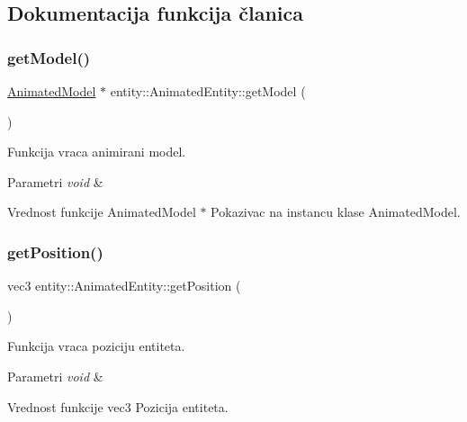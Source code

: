 \subsection{Dokumentacija funkcija članica}
\mbox{\label{classentity_1_1AnimatedEntity_ace7e7879a67cd75dac8cd867e79dd744}} 
\subsubsection{\texorpdfstring{get\+Model()}{getModel()}}
{\footnotesize\ttfamily \hyperlink{classmodel_1_1AnimatedModel}{Animated\+Model} $\ast$ entity\+::\+Animated\+Entity\+::get\+Model (\begin{DoxyParamCaption}{ }\end{DoxyParamCaption})}



Funkcija vraca animirani model. 


\begin{DoxyParams}{Parametri}
{\em void} & \\
\hline
\end{DoxyParams}
\begin{DoxyReturn}{Vrednost funkcije}
Animated\+Model $\ast$ Pokazivac na instancu klase Animated\+Model. 
\end{DoxyReturn}
\mbox{\label{classentity_1_1AnimatedEntity_adc612d974f4cb04142edc2a4dbe7c3fa}} 
\subsubsection{\texorpdfstring{get\+Position()}{getPosition()}}
{\footnotesize\ttfamily vec3 entity\+::\+Animated\+Entity\+::get\+Position (\begin{DoxyParamCaption}{ }\end{DoxyParamCaption})}



Funkcija vraca poziciju entiteta. 


\begin{DoxyParams}{Parametri}
{\em void} & \\
\hline
\end{DoxyParams}
\begin{DoxyReturn}{Vrednost funkcije}
vec3 Pozicija entiteta. 
\end{DoxyReturn}
\mbox{\label{classentity_1_1AnimatedEntity_a6dbb9afaea995f85a112f32efe7f77e8}} 
